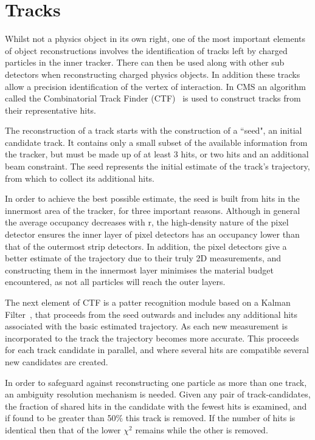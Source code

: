  
\section{Tracks}
\label{sec:trk}

Whilst not a physics object in its own right, one of the most important elements of object reconstructions involves the identification of tracks left by charged particles in the inner tracker. There can then be used along with other sub detectors when reconstructing charged physics objects. In addition these tracks allow a precision identification of the vertex of interaction. In CMS an algorithm called the Combinatorial Track Finder (CTF)~\cite{CTF} is used to construct tracks from their representative hits. 

The reconstruction of a track starts with the construction of a ``seed", an initial candidate track. It contains only a small subset of the available information from the tracker, but must be made up of at least 3 hits, or two hits and an additional beam constraint. The seed represents the initial estimate of the track's trajectory, from which to collect its additional hits. 

In order to achieve the best possible estimate, the seed is built from hits in the innermost area of the tracker, for three important reasons. Although in general the average occupancy decreases with r, the high-density nature of the pixel detector ensures the inner layer of pixel detectors has an occupancy lower than that of the outermost strip detectors. In addition, the pixel detectors give a better estimate of the trajectory due to their truly 2D measurements, and constructing them in the innermost layer minimises the material budget encountered, as not all particles will reach the outer layers. 

The next element of CTF is a patter recognition module based on a Kalman Filter~\cite{Kalman}, that proceeds from the seed outwards and includes any additional hits associated with the basic estimated trajectory. As each new measurement is incorporated to the track the trajectory becomes more accurate. This proceeds for each track candidate in parallel, and where several hits are compatible several new candidates are created. 

In order to safeguard against reconstructing one particle as more than one track, an ambiguity resolution mechanism is needed. Given any pair of track-candidates, the fraction of shared hits in the candidate with the fewest hits is examined, and if found to be greater than 50$\%$ this track is removed. If the number of hits is identical then that of the lower $\chi^{2}$ remains while the other is removed. 

